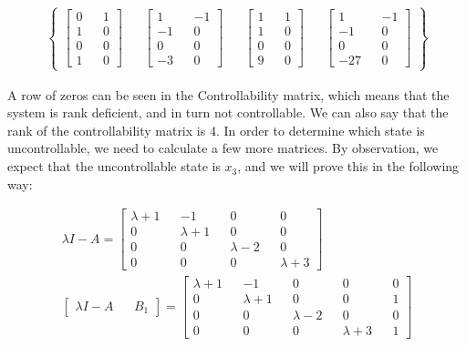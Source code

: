 \documentclass[paper=a4,margin, fontsize=11pt]{scrartcl} %
\numberwithin{equation}{section} %
\numberwithin{figure}{section} %
\numberwithin{table}{section} %
\begin{document}
\begin{align*}
\begin{Bmatrix}\begin{bmatrix}0 && 1\\1 && 0\\0 && 0\\1 && 0\end{bmatrix}&& \begin{bmatrix}1 && -1\\-1 && 0\\0 && 0\\-3 && 0\end{bmatrix} && \begin{bmatrix} 1 && 1\\1 && 0\\0 && 0\\9 && 0\end{bmatrix} && \begin{bmatrix}1 && -1\\-1 && 0\\0 && 0\\-27 && 0\end{bmatrix}
\end{Bmatrix}
\end{align*}

A row of zeros can be seen in the Controllability matrix, which means that the system is rank deficient, and in turn not controllable. We can also say that the rank of the controllability matrix is 4.  In order to determine which state is uncontrollable, we need to calculate a few more matrices.  By observation, we expect that the uncontrollable state is $x_3$, and we will prove this in the following way:

\begin{align*}
\lambda I-A=\begin{bmatrix} \lambda+1 && -1 && 0 && 0\\0 && \lambda+1 && 0 && 0\\0 && 0 && \lambda-2 && 0\\0 && 0 && 0 && \lambda+3\end{bmatrix}\\
\begin{bmatrix}\lambda I-A && B_1\end{bmatrix}=\begin{bmatrix} \lambda+1 && -1 && 0 && 0 && 0\\0 && \lambda+1 && 0 && 0 && 1\\0 && 0 && \lambda-2 && 0 && 0\\0 && 0 && 0 && \lambda+3 && 1\end{bmatrix}
\end{align*}
\end{document}
